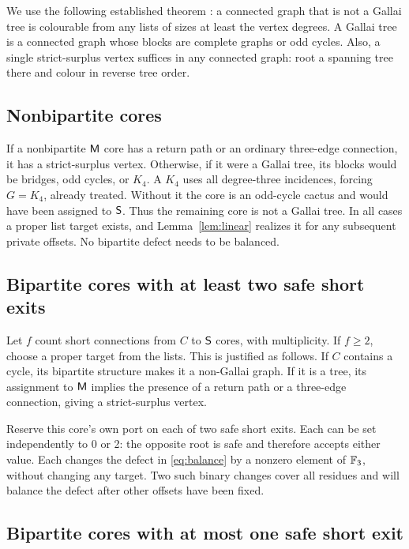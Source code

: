 We use the following established theorem \cite[Theorem~A]{CR17}:
a connected graph that is not a Gallai tree is colourable from any
lists of sizes at least the vertex degrees.  A Gallai tree is a
connected graph whose blocks are complete graphs or odd cycles.
Also, a single strict-surplus vertex suffices in any connected graph:
root a spanning tree there and colour in reverse tree order.

\subsection{Nonbipartite cores}

If a nonbipartite $\mathsf M$ core has a return path or an ordinary
three-edge connection, it has a strict-surplus vertex.  Otherwise,
if it were a Gallai tree, its blocks would be bridges, odd cycles,
or $K_4$.  A $K_4$ uses all degree-three incidences, forcing
$G=K_4$, already treated.  Without it the core is an odd-cycle
cactus and would have been assigned to $\mathsf S$.  Thus the remaining
core is not a Gallai tree.  In all cases a proper list target exists,
and Lemma~\ref{lem:linear} realizes it for any subsequent private
offsets.  No bipartite defect needs to be balanced.

\subsection{Bipartite cores with at least two safe short exits}

Let $f$ count short connections from $C$ to $\mathsf S$ cores, with
multiplicity.  If $f\ge2$, choose a proper target from the lists.
This is justified as follows.  If $C$ contains a cycle, its bipartite
structure makes it a non-Gallai graph.  If it is a tree, its assignment
to $\mathsf M$ implies the presence of a return path or a three-edge
connection, giving a strict-surplus vertex.

Reserve this core's own port on each of two safe short exits.  Each
can be set independently to 0 or 2: the opposite root is safe and
therefore accepts either value.  Each changes the defect in
\eqref{eq:balance} by a nonzero element of $\mathbb F_3$, without changing
any target.  Two such binary changes cover all residues and will
balance the defect after other offsets have been fixed.

\subsection{Bipartite cores with at most one safe short exit}

